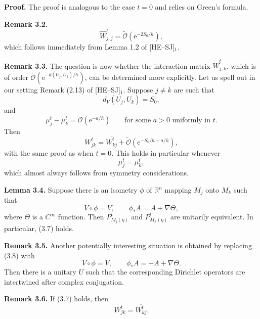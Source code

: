 \documentclass[11pt]{article}
\newcommand{\R}{\mathbb{R}}
\newcommand{\Ot}{\widetilde{\mathcal O}}
\newcommand{\OO}{\mathcal O}
\newcommand{\e}{\mathrm{e}}
\begin{document}
\noindent\textbf{Proof.}
The proof is analogous to the case $t=0$ and relies on Green's formula.

\medskip
\noindent\textbf{Remark 3.2.}
\[
\widehat W_{j,j}^t=\Ot(\e^{-2S_0/h}),
\]
which follows immediately from Lemma 1.2 of [HE--SJ]$_1$.

\medskip
\noindent\textbf{Remark 3.3.}
The question is now whether the interaction matrix $\widehat W_{j,k}^t$, which is of order $\Ot(\e^{-d(U_j,U_k)/h})$, can be determined more explicitly. Let us spell out in our setting Remark (2.13) of [HE--SJ]$_1$.
Suppose $j\ne k$ are such that
\begin{equation}
d_V(U_j,U_k)=S_0,
\tag{3.4}
\end{equation}
and
\begin{equation}
\mu_j^t-\mu_k^t=\OO(\e^{-a/h})
\qquad\text{for some }a>0\text{ uniformly in }t.
\tag{3.5}
\end{equation}
Then
\begin{equation}
W_{jk}^t=\overline{W_{kj}^t}+\Ot(\e^{-S_0/h-a/h}),
\tag{3.6}
\end{equation}
with the same proof as when $t=0$. This holds in particular whenever
\begin{equation}
\mu_j^t=\mu_k^t,
\tag{3.7}
\end{equation}
which almost always follows from symmetry considerations.

\medskip
\noindent\textbf{Lemma 3.4.}
Suppose there is an isometry $\phi$ of $\R^n$ mapping $M_j$ onto $M_k$ such that
\begin{equation}
V\circ\phi=V,
\qquad
\phi_*A=A+\nabla\Theta,
\tag{3.8}
\end{equation}
where $\Theta$ is a $C^\infty$ function. Then $P^t_{M_j(\eta)}$ and $P^t_{M_k(\eta)}$ are unitarily equivalent. In particular, (3.7) holds.

\medskip
\noindent\textbf{Remark 3.5.}
Another potentially interesting situation is obtained by replacing (3.8) with
\begin{equation}
V\circ\phi=V,
\qquad
\phi_*A=-A+\nabla\Theta.
\tag{3.8$'$}
\end{equation}
Then there is a unitary $U$ such that the corresponding Dirichlet operators are intertwined after complex conjugation.

\medskip
\noindent\textbf{Remark 3.6.}
If (3.7) holds, then
\begin{equation}
W_{jk}^t=\overline{W_{kj}^t}.
\tag{3.9}
\end{equation}
\end{document}
